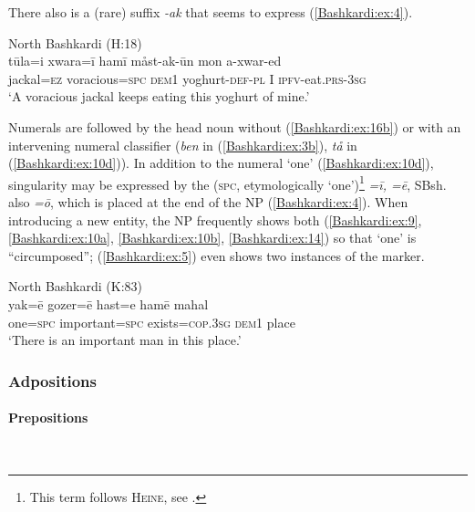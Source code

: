 \documentclass[output=paper,colorlinks,citecolor=brown]{langscibook}
\begin{document}
There also is a (rare) suffix \textit{-ak} that seems to express  (\ref{Bashkardi:ex:4}). 

\ea\label{Bashkardi:ex:4}
North Bashkardi (H:18) \\
\gll tūla=i xwara=ī hamī måst-ak-ūn mon a-xwar-ed\\
jackal\textsc{=ez} voracious\textsc{=spc} \textsc{dem1} yoghurt\textsc{-def}\textsc{-pl}{\footnotemark} I \textsc{ipfv-}eat\textsc{.prs}\textsc{-3sg} \\
\glt `A voracious jackal keeps eating this yoghurt of mine.'
\z{}

{Numerals} are followed by the head noun without (\ref{Bashkardi:ex:16b}) or with an intervening numeral classifier (\textit{ben} in (\ref{Bashkardi:ex:3b}), \textit{tå} in (\ref{Bashkardi:ex:10d})). In addition to the numeral `one' (\ref{Bashkardi:ex:10d}), singularity may be expressed by the   (\textsc{spc}, etymologically `one')\footnote{
This term follows \textsc{Heine}, see \citet[85]{korn_notes_2017}.
} \textit{=ī, =ē}, SBsh. also \textit{=ō}, which is placed at the end of the NP (\ref{Bashkardi:ex:4}). When introducing a new entity, the NP frequently shows both (\ref{Bashkardi:ex:9}, \ref{Bashkardi:ex:10a}, \ref{Bashkardi:ex:10b}, \ref{Bashkardi:ex:14}) so that `one' is ``circumposed''; (\ref{Bashkardi:ex:5}) even shows two instances of the  marker. 

\ea\label{Bashkardi:ex:5} 
North Bashkardi (K:83) \\
\gll yak=ē gozer=ē hast=e hamē mahal \\ 
one\textsc{=spc} important\textsc{=spc} exists=\textsc{cop.3sg}{\footnotemark} \textsc{dem1} place \\
\glt `There is an important man in this place.'
\z


\subsubsection{Adpositions}\label{Bashkardi:ss:2.1.3}

\paragraph{Prepositions}\label{Bashkardi:ss:2.1.3.1}\mbox{}\\
\end{document}
